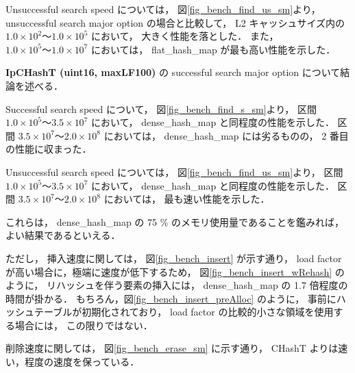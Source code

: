 Unsuccessful search speed については，
図\ref{fig_bench_find_us_sm}より，
unsuccessful search major option の場合と比較して，
L2 キャッシュサイズ内の $1.0\times10^2〜1.0\times10^5$ において，
大きく性能を落とした．
また，$1.0\times10^5〜1.0\times10^7$ においては，
flat\_hash\_map が最も高い性能を示した．
\newline

{\bf IpCHashT (uint16, maxLF100)} の successful search major option について結論を述べる．

Successful search speed について，
図\ref{fig_bench_find_s_sm}より，
区間 $1.0\times10^5〜3.5\times10^7$ において，
dense\_hash\_map と同程度の性能を示した．
区間 $3.5\times10^7〜2.0\times10^8$ においては，
dense\_hash\_map には劣るものの，
2 番目の性能に収まった．

Unsuccessful search speed については，
図\ref{fig_bench_find_us_sm}より，
区間 $1.0\times10^5〜3.5\times10^7$ において，
dense\_hash\_map と同程度の性能を示した．
区間 $3.5\times10^7〜2.0\times10^8$ においては，
最も速い性能を示した．

これらは，
dense\_hash\_map の 75 \% のメモリ使用量であることを鑑みれば，
よい結果であるといえる．

ただし，
挿入速度に関しては，
図\ref{fig_bench_insert} が示す通り，
load factor が高い場合に，極端に速度が低下するため，
図\ref{fig_bench_insert_wRehash} のように，
リハッシュを伴う要素の挿入には，
dense\_hash\_map の 1.7 倍程度の時間が掛かる．
もちろん，図\ref{fig_bench_insert_preAlloc} のように，
事前にハッシュテーブルが初期化されており，
load factor の比較的小さな領域を使用する場合には，
この限りではない．

削除速度に関しては，
図\ref{fig_bench_erase_sm} に示す通り，
CHashT よりは速い，程度の速度を保っている．
\newline


